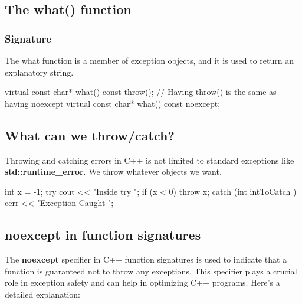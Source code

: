 \documentclass{report}
\begin{document}
    \bigbreak \noindent 
    \subsection{The what() function}
    \bigbreak \noindent 
    \subsubsection{Signature}
    \bigbreak \noindent 
    The what function is a member of exception objects, and it is used to return an explanatory string.
    \begin{cppcode}
    virtual const char* what() const throw(); // Having throw() is the same as having noexcept
    virtual const char* what() const noexcept;
    \end{cppcode}

    \bigbreak \noindent 
    \subsection{What can we throw/catch?}
    \bigbreak \noindent 
    Throwing and catching errors in C++ is not limited to standard exceptions like \textbf{std::runtime\_error}. We throw whatever objects we want.
    \bigbreak \noindent 
    \begin{cppcode}
        int x = -1;
        try {
            cout << "Inside try \n";
            if (x < 0) {
                throw x;
            }
        } catch (int intToCatch ) {
            cerr << "Exception Caught \n";
        }
    \end{cppcode}
    \bigbreak \noindent 

    \bigbreak \noindent 
    \subsection{noexcept in function signatures}
    \bigbreak \noindent 
    \begin{concept}
        The \textbf{noexcept} specifier in C++ function signatures is used to indicate that a function is guaranteed not to throw any exceptions. This specifier plays a crucial role in exception safety and can help in optimizing C++ programs. Here's a detailed explanation:
    \end{concept}
\end{document}
